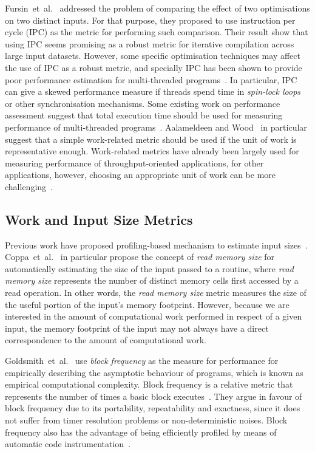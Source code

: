\documentclass[sigplan,10pt]{acmart}
\newcommand{\etal}{et~al.}
\newcommand{\itercomp}{{iterative compilation}}
\begin{document}
Fursin~\etal~\cite{fursin07} addressed the problem of comparing the effect of two optimisations on two distinct inputs. For that purpose, they proposed to use instruction per cycle (IPC) as the metric for performing such comparison.
Their result show that using IPC seems promising as a robust metric for {\itercomp} across large input datasets.
However, some specific optimisation techniques may affect the use of IPC as a robust metric, and specially IPC has been shown to provide poor performance estimation for multi-threaded programs~\cite{alameldeen06,eyerman08}.
In particular, IPC can give a skewed performance measure if threads spend time in \textit{spin-lock loops} or other synchronisation mechanisms. 
Some existing work on performance assessment suggest that total execution time should be used for measuring performance of multi-threaded programs~\cite{alameldeen06,eyerman08}.
Aalameldeen and Wood~\cite{alameldeen06} in particular suggest that a simple work-related metric should be used if the unit of work is representative enough.
Work-related metrics have already been largely used for measuring performance of throughput-oriented applications, for other applications, however, choosing an appropriate unit of work can be more challenging~\cite{alameldeen06}.

\subsection{Work and Input Size Metrics}

Previous work have proposed profiling-based mechanism to estimate input sizes~\cite{zaparanuks12,coppa14}.
Coppa~\etal~\cite{coppa14} in particular propose the concept of \textit{read memory size} for automatically estimating the size of the input passed to a routine, where \textit{read memory size} represents the number of distinct memory cells first accessed by a read operation.
In other words, the \textit{read memory size} metric measures the size of the useful portion of the input's memory footprint.
However, because we are interested in the amount of computational work performed in respect of a given input, the memory footprint of the input may not always have a direct correspondence to  the amount of computational work.

Goldsmith~\etal~\cite{goldsmith07} use \textit{block frequency} as the measure for performance for empirically describing the asymptotic behaviour of programs, which is known as empirical computational complexity.
Block frequency is a relative metric that represents the number of times a basic block executes~\cite{ball94,ball96}.
They argue in favour of block frequency due to its portability, repeatability and exactness, since it does not suffer from timer resolution problems or non-deterministic noises.
Block frequency also has the advantage of being efficiently profiled by means of automatic code instrumentation~\cite{knuth73,ball94}.
\end{document}
